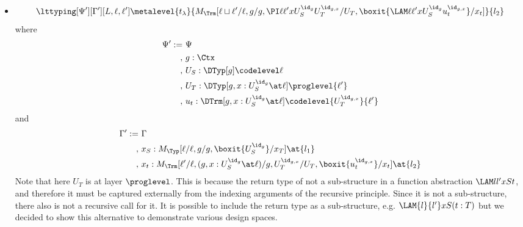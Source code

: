 \begin{itemize}
\begin{align*}
{       $x_t$,}\\
    \tag{which in this case is also the type of $u_s$} \\
    ,&~x_{s'} : M_\Trm[\ell/\ell,(g, x : \Nat\at 0, y : U_M^{\id_{g,x}} \at
       \ell)/g,U_M^{\id_g,\su x/x}/U_T,\boxit{u_{s'}^{\id_{g,x,y}}}/x_t] \at{l_2}
       \tag{the recursive call for the step case; similar logic applies but more longer}\\
    ,&~x_t : M_\Trm[\ell/\ell,g/g,\Nat/U_T,\boxit{u_t^\id}/x_t] \at{l_2}
       \tag{the recursive call for the scrutinee}
  \end{align*}
\item
  \[
    \lttyping[\Psi'][\Gamma'][L,\ell,\ell']\metalevel{t_\lambda}{M_\Trm[\ell\sqcup \ell'/\ell,g/g,\PI
      \ell{\ell'}x{U_S^{\id_g}}{U_T^{\id_{g,x}}}/U_T, \boxit{\LAM \ell{\ell'} x{U_S^{\id_g}}{u_t^{\id_{g,x}}}}/x_t]}{l_2}
  \]
  where
  \begin{align*}
    \Psi' :=&~ \Psi \\
    ,&~g : \Ctx \\
    ,&~U_S : \DTyp[g]\codelevel \ell \\
    ,&~U_T : \DTyp[g, x : U_S^{\id_g} \at \ell]\proglevel{\ell'} \\
    ,&~u_t : \DTrm[g, x : U_S^{\id_g} \at \ell]\codelevel{U_T^{\id_{g,x}}}{\ell'}
  \end{align*}
  and
  \begin{align*}
    \Gamma' :=&~\Gamma \\
    ,&~x_S : M_\Typ[\ell/\ell,g/g,\boxit{U_S^{\id_g}}/x_T] \at{l_1} \\
    ,&~x_t : M_\Trm[\ell'/\ell,(g,x : U_S^{\id_g} \at \ell)/g,U_T^{\id_{g,x}}/U_T,\boxit{u_t^{\id_{g,x}}}/x_t] \at{l_2}
  \end{align*}
  Note that here $U_T$ is at layer $\proglevel$. %
  This is because the return type of not a sub-structure in a function abstraction
  $\LAM l{l'} x S t$, and therefore it must be captured externally from the indexing
  arguments of the recursive principle. %
  Since it is not a sub-structure, there also is not a recursive call for it. %
  It is possible to include the return type as a sub-structure, e.g. $\LAM{l}{l'}x S{(t
    : T)}$ but we decided to show this alternative to demonstrate various design spaces.
  

\end{itemize}
